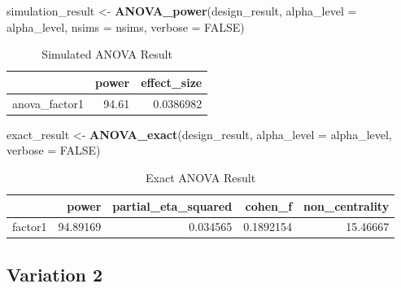 \documentclass[]{book}
\newenvironment{Shaded}{\begin{snugshade}}{\end{snugshade}}
\newcommand{\DataTypeTok}[1]{\textcolor[rgb]{0.13,0.29,0.53}{#1}}
\newcommand{\KeywordTok}[1]{\textcolor[rgb]{0.13,0.29,0.53}{\textbf{#1}}}
\newcommand{\NormalTok}[1]{#1}
\newcommand{\OtherTok}[1]{\textcolor[rgb]{0.56,0.35,0.01}{#1}}
\newcommand{\StringTok}[1]{\textcolor[rgb]{0.31,0.60,0.02}{#1}}
\begin{document}
\begin{Shaded}
\begin{Highlighting}[]
\NormalTok{simulation_result <-}\StringTok{ }\KeywordTok{ANOVA_power}\NormalTok{(design_result, }
                                 \DataTypeTok{alpha_level =}\NormalTok{ alpha_level, }
                                 \DataTypeTok{nsims =}\NormalTok{ nsims,}
                                 \DataTypeTok{verbose =} \OtherTok{FALSE}\NormalTok{)}
\end{Highlighting}
\end{Shaded}

\begin{table}[!h]

\caption{\label{tab:unnamed-chunk-64}Simulated ANOVA Result}
\centering
\begin{tabular}{l|r|r}
\hline
  & power & effect\_size\\
\hline
anova\_factor1 & 94.61 & 0.0386982\\
\hline
\end{tabular}
\end{table}

\begin{Shaded}
\begin{Highlighting}[]
\NormalTok{exact_result <-}\StringTok{ }\KeywordTok{ANOVA_exact}\NormalTok{(design_result,}
                            \DataTypeTok{alpha_level =}\NormalTok{ alpha_level,}
                            \DataTypeTok{verbose =} \OtherTok{FALSE}\NormalTok{)}
\end{Highlighting}
\end{Shaded}

\begin{table}[!h]

\caption{\label{tab:unnamed-chunk-66}Exact ANOVA Result}
\centering
\begin{tabular}{l|r|r|r|r}
\hline
  & power & partial\_eta\_squared & cohen\_f & non\_centrality\\
\hline
factor1 & 94.89169 & 0.034565 & 0.1892154 & 15.46667\\
\hline
\end{tabular}
\end{table}

\hypertarget{variation-2}{%
\subsection{Variation 2}\label{variation-2}}
\end{document}
